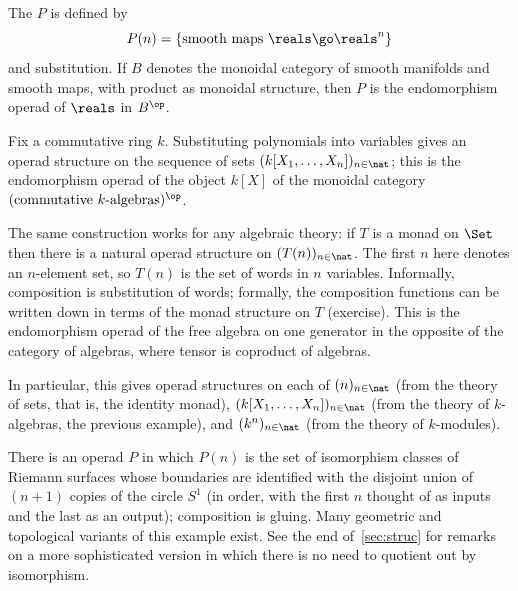 \begin{example}
The %
%
%
$P$ is defined by
\[
P(n) =
\{ \textrm{smooth maps } \reals \go \reals^n \}
\]
and substitution.  If $B$ denotes the monoidal category of smooth
manifolds%
%
%
and smooth maps, with product as monoidal structure, then $P$ is the
endomorphism operad of $\reals$ in $B^\op$.  
\end{example}

\begin{example}
Fix a commutative ring $k$.  Substituting polynomials into variables gives
an operad structure on the sequence of sets $(k[X_1, \ldots,
X_n])_{n\in\nat}$; this is the endomorphism operad of the object $k[X]$
of the monoidal category $(\textrm{commutative }k\textrm{-algebras})^\op$.%
%
%
\end{example}

\begin{example}
The same construction works for any algebraic%
%
%
%
theory: if $T$ is a monad on
$\Set$ then there is a natural operad structure on $(T(n))_{n\in\nat}$.
The first $n$ here denotes an $n$-element set, so $T(n)$ is the set of
words in $n$ variables.  Informally, composition is substitution of words;
formally, the composition functions can be written down in terms of the
monad structure on $T$ (exercise).  This is the endomorphism operad of the
free algebra on one generator in the opposite of the category of algebras,
where tensor is coproduct of algebras.  

In particular, this gives operad structures on each of $(n)_{n\in\nat}$
(from the theory of sets, that is, the identity monad), $(k[X_1, \ldots,
X_n])_{n\in\nat}$ (from the theory of $k$-algebras, the previous example),
and $(k^n)_{n\in\nat}$ (from the theory of $k$-modules).
\end{example}

\begin{example}	
There is an operad $P$ in which $P(n)$ is the set of isomorphism classes of
Riemann%
%
%
surfaces whose boundaries are identified with the disjoint union of
$(n+1)$ copies of the circle $S^1$ (in order, with the first $n$ thought of
as inputs and the last as an output); composition is gluing.  Many
geometric and topological variants of this example exist.  See the end
of~\ref{sec:struc} for remarks on a more sophisticated version in which
there is no need to quotient out by isomorphism.
\end{example}

